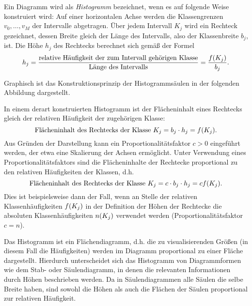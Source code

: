 \documentclass{lecture}
\begin{document}
    \begin{definition}
        Ein Diagramm wird als \emph{Histogramm} bezeichnet, wenn es auf folgende Weise konstruiert wird: Auf einer horizontalen Achse werden die Klassengrenzen \(v_0, \ldots, v_M\) der Intervalle abgetragen.
        Über jedem Intervall \(K_j\) wird ein Rechteck gezeichnet, dessen Breite gleich der Länge des Intervalls, also der Klassenbreite \(b_j\), ist.
        Die Höhe \(h_j\) des Rechtecks berechnet sich gemäß der Formel
        \[
            h_j = \frac{\text{relative Häufigkeit der zum Intervall gehörigen Klasse}}{\text{Länge des Intervalls}} = \frac{f\parentheses*{K_j}}{b_j}.
        \]
    \end{definition}

    Graphisch ist das Konstruktionsprinzip der Histogrammsäulen in der folgenden Abbildung dargestellt.
    \begin{center}
    \end{center}
    In einem derart konstruierten Histogramm ist der Flächeninhalt eines Rechtecks gleich der relativen Häufigkeit der zugehörigen Klasse:
    \[
        \text{Flächeninhalt des Rechtecks der Klasse }K_j = b_j \cdot h_j = f\parentheses*{K_j}.
    \]
    Aus Gründen der Darstellung kann ein Proportionalitätsfaktor \(c > 0\) eingeführt werden, der etwa eine Skalierung der Achsen ermöglicht.
    Unter Verwendung eines Proportionalitätsfaktors sind die Flächeninhalte der Rechtecke proportional zu den relativen Häufigkeiten der Klassen, d.h.
    \[
        \text{Flächeninhalt des Rechtecks der Klasse }K_j = c \cdot b_j \cdot h_j = cf\parentheses*{K_j}.
    \]
    Dies ist beispielsweise dann der Fall, wenn an Stelle der relativen Klassenhäufigkeiten \(f\parentheses*{K_j}\) in der Definition der Höhen der Rechtecke die absoluten Klassenhäufigkeiten \(n\parentheses*{K_j}\) verwendet werden (Proportionalitätsfaktor \(c = n\)).

    Das Histogramm ist ein Flächendiagramm, d.h. die zu visualisierenden Größen (in diesem Fall die Häufigkeiten) werden im Diagramm proportional zu einer Fläche dargestellt.
    Hierdurch unterscheidet sich das Histogramm von Diagrammformen wie dem Stab- oder Säulendiagramm, in denen die relevanten Informationen durch Höhen beschrieben werden.
    Da in Säulendiagrammen alle Säulen die selbe Breite haben, sind sowohl die Höhen als auch die Flächen der Säulen proportional zur relativen Häufigkeit.
\end{document}
